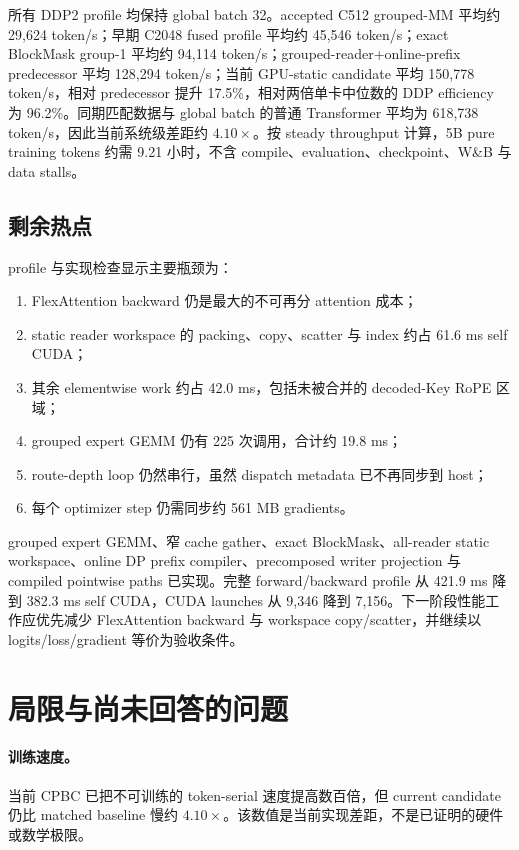 \documentclass[UTF8,twocolumn,10pt,a4paper]{ctexart}
\newcommand{\CPBC}{\textsf{CPBC}}
\begin{document}
所有 DDP2 profile 均保持 global batch 32。accepted C512 grouped-MM 平均约 29,624 token/s；早期 C2048 fused profile 平均约 45,546 token/s；exact BlockMask group-1 平均约 94,114 token/s；grouped-reader+online-prefix predecessor 平均 128,294 token/s；当前 GPU-static candidate 平均 150,778 token/s，相对 predecessor 提升 17.5\%，相对两倍单卡中位数的 DDP efficiency 为 96.2\%。同期匹配数据与 global batch 的普通 Transformer 平均为 618,738 token/s，因此当前系统级差距约 $4.10\times$。按 steady throughput 计算，5B pure training tokens 约需 9.21 小时，不含 compile、evaluation、checkpoint、W\&B 与 data stalls。

\subsection{剩余热点}
profile 与实现检查显示主要瓶颈为：
\begin{enumerate}
  \item FlexAttention backward 仍是最大的不可再分 attention 成本；
  \item static reader workspace 的 packing、copy、scatter 与 index 约占 61.6 ms self CUDA；
  \item 其余 elementwise work 约占 42.0 ms，包括未被合并的 decoded-Key RoPE 区域；
  \item grouped expert GEMM 仍有 225 次调用，合计约 19.8 ms；
  \item route-depth loop 仍然串行，虽然 dispatch metadata 已不再同步到 host；
  \item 每个 optimizer step 仍需同步约 561 MB gradients。
\end{enumerate}
grouped expert GEMM、窄 cache gather、exact BlockMask、all-reader static workspace、online DP prefix compiler、precomposed writer projection 与 compiled pointwise paths 已实现。完整 forward/backward profile 从 421.9 ms 降到 382.3 ms self CUDA，CUDA launches 从 9,346 降到 7,156。下一阶段性能工作应优先减少 FlexAttention backward 与 workspace copy/scatter，并继续以 logits/loss/gradient 等价为验收条件。

\section{局限与尚未回答的问题}
\paragraph{训练速度。}
当前 \CPBC{} 已把不可训练的 token-serial 速度提高数百倍，但 current candidate 仍比 matched baseline 慢约 $4.10\times$。该数值是当前实现差距，不是已证明的硬件或数学极限。
\end{document}
